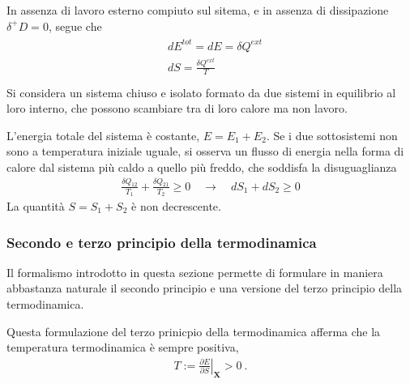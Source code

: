 \documentclass[letterpaper,10pt,italian]{jupyterBook}
\begin{document}
\sphinxAtStartPar
In assenza di lavoro esterno compiuto sul sitema, e in assenza di dissipazione \(\delta^+ D = 0\), segue che
\begin{equation*}
\begin{split}\begin{aligned}
 & d E^{tot} = d E = \delta Q^{ext} \\
 & d S = \frac{\delta Q^{ext}}{T} \\
\end{aligned}\end{split}
\end{equation*}
\sphinxAtStartPar
Si considera un sistema chiuso e isolato formato da due sistemi in equilibrio al loro interno, che possono scambiare tra di loro calore ma non lavoro.

\sphinxAtStartPar
L’energia totale del sistema è costante, \(E = E_1 + E_2\). Se i due sottosistemi non sono a temperatura iniziale uguale, si osserva un flusso di energia nella forma di calore dal sistema più caldo a quello più freddo, che soddisfa la disuguaglianza
\begin{equation*}
\begin{split}
 \frac{\delta Q_{12}}{T_1} + \frac{\delta Q_{21}}{T_2} \ge 0 \quad \rightarrow \quad
 d S_1 + d S_2 \ge 0
\end{split}
\end{equation*}
\sphinxAtStartPar
La quantità \(S = S_1 + S_2\) è non decrescente.


\subsubsection*{Secondo e terzo principio della termodinamica}

\sphinxAtStartPar
Il formalismo introdotto in questa sezione permette di formulare in maniera abbastanza naturale il secondo principio e una versione del terzo principio della termodinamica.

\sphinxAtStartPar
Questa formulazione del terzo prinicpio della termodinamica afferma che la temperatura termodinamica è sempre positiva,
\begin{equation*}
\begin{split} T:= \left.\frac{\partial E}{\partial S}\right|_{\mathbf{X}} > 0 \ .\end{split}
\end{equation*}
\sphinxAtStartPar
{} 
\end{document}
